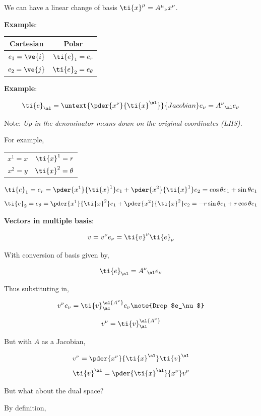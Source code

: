 \documentclass{article}
\newcommand{\heading}[1]{\vspace{0.1in}\textbf{#1}:}
\begin{document}
We can have a linear change of basis $\ti{x}^\mu = {A^\mu}_\nu x^\nu $.

\heading{Example}

\begin{center}
\begin{tabular}{c|c}
    Cartesian & Polar \\
    \hline
    $e_1 = \ve{i}$ & $\ti{e}_1 = e_r$ \\
    $e_2 = \ve{j}$ & $\ti{e}_2 = e_\theta$ \\
\end{tabular}
\end{center}

\heading{Example}

\[ \ti{e}_\al = \untext{\pder{x^\nu}{\ti{x}^\al}}{Jacobian} e_\nu = {A^{\nu}}_\al e_\nu \]

Note: \textit{Up in the denominator means down on the original coordinates (LHS).}

For example,

\begin{center}
\begin{tabular}{c|c}
    $x^1 = x$ & $\ti{x}^1 = r$ \\
    $x^2 = y$ & $\ti{x}^2 = \theta$ \\
\end{tabular}
\end{center}

\[ \ti{e}_1 = e_r = \pder{x^1}{\ti{x}^1} e_1 + \pder{x^2}{\ti{x}^1} e_2 = \cos \theta e_1 + \sin \theta e_1 \]
\[ \ti{e}_2 = e_\theta = \pder{x^1}{\ti{x}^2} e_1 + \pder{x^2}{\ti{x}^2} e_2 = - r \sin \theta e_1 + r \cos \theta e_1 \]

\heading{Vectors in multiple basis}

\[ v = v^\nu e_\nu = \ti{v}^\nu \ti{e}_\nu \]

With conversion of basis given by,

\[ \ti{e}_\al = {A^\nu}_\al e_\nu\]

Thus substituting in,

\[ v^\nu e_\nu = \ti{v}^\al {A^\nu}_\al e_\nu \note{Drop $e_\nu$}\]

\[ v^\nu = \ti{v}^\al {A^\nu}_\al \]

But with $A$ as a Jacobian,

\[ v^\nu = \pder{x^\nu}{\ti{x}^\al} \ti{v}^\al \]
\[  \ti{v}^\al = \pder{\ti{x}^\al}{x^\nu} v^\nu \]

But what about the dual space?

By definition,
\end{document}
